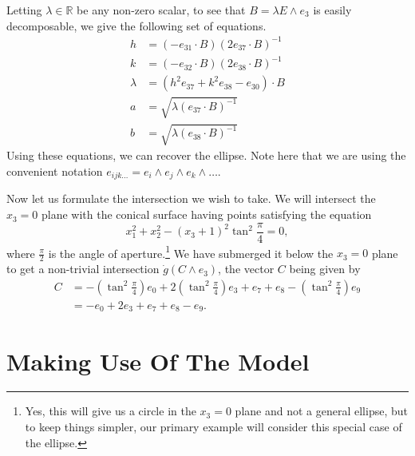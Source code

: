\documentclass{birkjour}
\theoremstyle{definition}
\theoremstyle{remark}
\numberwithin{equation}{section}
\newcommand{\R}{\mathbb{R}}
\newcommand{\gd}{\dot{g}}
\begin{document}
Letting $\lambda\in\R$ be any non-zero scalar, to see that
$B=\lambda E\wedge e_3$ is easily decomposable, we give the following set of
equations.
\begin{align}
h &= (-e_{31}\cdot B)(2e_{37}\cdot B)^{-1}\label{equ_decompose_first} \\
k &= (-e_{32}\cdot B)(2e_{38}\cdot B)^{-1} \\
\lambda &= (h^2e_{37}+k^2e_{38}-e_{30})\cdot B \\
a &= \sqrt{\lambda(e_{37}\cdot B)^{-1}} \\
b &= \sqrt{\lambda(e_{38}\cdot B)^{-1}}\label{equ_decompose_last}
\end{align}
Using these equations, we can recover the ellipse.  Note here that we
are using the convenient notation $e_{ijk\dots} = e_i\wedge e_j\wedge e_k\wedge\dots$.

Now let us formulate the intersection we wish to take.  We will
intersect the $x_3=0$ plane with the conical surface having points satisfying the equation
\begin{equation}\label{equ_conical_surface}
x_1^2+x_2^2 - (x_3+1)^2\tan^2\frac{\pi}{4} = 0,
\end{equation}
where $\frac{\pi}{2}$ is the angle of aperture.\footnote{Yes, this will give
us a circle in the $x_3=0$ plane and not a general ellipse, but to keep things
simpler, our primary example will consider this special case of the ellipse.}  We have submerged it
below the $x_3=0$ plane to get a non-trivial intersection $\gd(C\wedge e_3)$,
the vector $C$ being given by
\begin{align*}
C &= -\left(\tan^2\frac{\pi}{4}\right)e_0 + 2\left(\tan^2\frac{\pi}{4}\right)e_3 + e_7 + e_8 - \left(\tan^2\frac{\pi}{4}\right)e_9 \\
 &= -e_0 + 2e_3 + e_7 + e_8 - e_9.
\end{align*}

\section{Making Use Of The Model}
\end{document}
